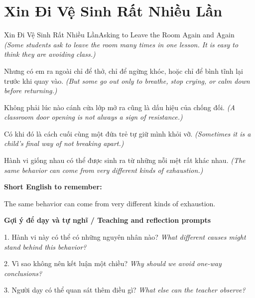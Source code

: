 \section{Xin Đi Vệ Sinh Rất Nhiều Lần}
\begin{truyen}{Xin Đi Vệ Sinh Rất Nhiều Lần}{Asking to Leave the Room Again and Again}
\textit{(Some students ask to leave the room many times in one lesson. It is easy to think they are avoiding class.)}

Nhưng có em ra ngoài chỉ để thở, chỉ để ngừng khóc, hoặc chỉ để bình tĩnh lại trước khi quay vào.
\textit{(But some go out only to breathe, stop crying, or calm down before returning.)}

Không phải lúc nào cánh cửa lớp mở ra cũng là dấu hiệu của chống đối.
\textit{(A classroom door opening is not always a sign of resistance.)}

Có khi đó là cách cuối cùng một đứa trẻ tự giữ mình khỏi vỡ.
\textit{(Sometimes it is a child’s final way of not breaking apart.)}

\end{truyen}

\begin{baihoc}
Hành vi giống nhau có thể được sinh ra từ những nỗi mệt rất khác nhau.
\textit{(The same behavior can come from very different kinds of exhaustion.)}
\end{baihoc}

\begin{ghinhoanh}
\textbf{Short English to remember:}

The same behavior can come from very different kinds of exhaustion.

\end{ghinhoanh}

\begin{tuhocnhanh}
\textbf{Gợi ý để dạy và tự nghĩ / Teaching and reflection prompts}

1. Hành vi này có thể có những nguyên nhân nào? \textit{What different causes might stand behind this behavior?}

2. Vì sao không nên kết luận một chiều? \textit{Why should we avoid one-way conclusions?}

3. Người dạy có thể quan sát thêm điều gì? \textit{What else can the teacher observe?}
\end{tuhocnhanh}
\ngancach

